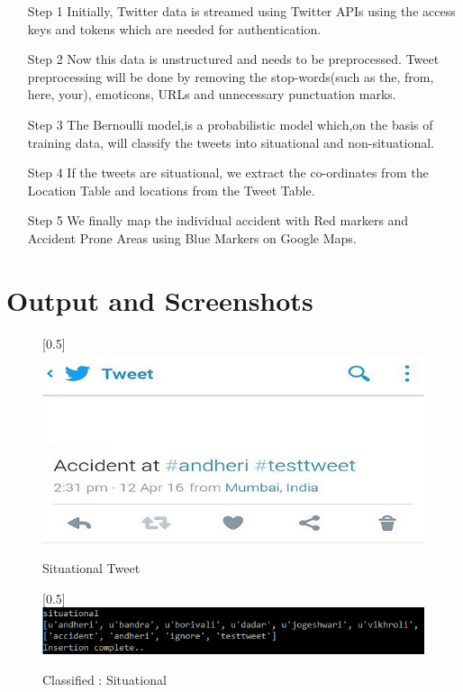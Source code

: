 \documentclass[journal]{IEEEtran}
\begin{document}
\begin{enumerate}
	\item[Step 1] Initially, Twitter data is streamed using Twitter APIs using the access keys and tokens which are needed for authentication. 
	\item[Step 2] Now this data is unstructured and needs to be preprocessed. Tweet preprocessing will be done by removing the stop-words(such as the, from, here, your), emoticons, URLs and unnecessary punctuation marks.
	\item[Step 3] The Bernoulli model,is a probabilistic model which,on the basis of training data, will classify the tweets into situational and non-situational.
	\item[Step 4] If the tweets are situational, we extract the co-ordinates from the Location Table and locations from the Tweet Table.
	\item[Step 5] We finally map the individual accident with Red markers and Accident Prone Areas using Blue Markers on Google Maps.
\end{enumerate}
\section{Output and Screenshots}
\begin{center}
	\begin{figure}[H]
		\scalebox{0.5}[0.5]{\includegraphics{SituationalTweet}}
		\caption{Situational Tweet}
		\label{SituationalTweet}
	\end{figure}
\end{center}

\begin{center}
	\begin{figure}[H]
		\scalebox{0.5}[0.5]{\includegraphics{Situational}}
		\caption{Classified : Situational}
		\label{ClassifiedSituational}
	\end{figure}
\end{center}
\end{document}
